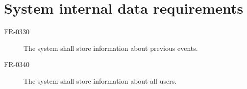 \section{System internal data requirements}

\begin{description}
\item [FR-0330] The system shall store information about previous events.
\item [FR-0340] The system shall store information about all users.
\end{description}